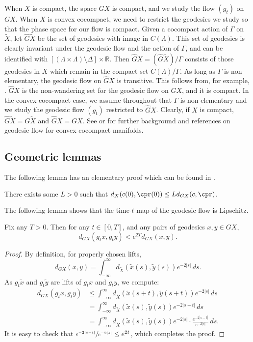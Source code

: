 When $X$ is compact, the space $GX$ is compact, and we study the flow $(g_t)$ on $GX$. When $X$ is convex cocompact, we need to restrict the geodesics we study so that the phase space for our flow is compact. Given a cocompact action of $\Gamma$ on $\tilde X$, let $\hat G\tilde X$ be the set of geodesics with image in $C(\Lambda)$. This set of geodesics is clearly invariant under the geodesic flow and the action of $\Gamma$, and can be identified with $[(\Lambda \times \Lambda)\setminus \Delta]\times \mathbb{R}$. Then $\hat G X = (\hat G\tilde X)/\Gamma$ consists of those geodesics in $X$ which remain in the compact set $C(\Lambda)/\Gamma$. As long as $\Gamma$ is non-elementary, the geodesic flow on $\hat GX$ is transitive. This follows from, for example, \cite[\S8.2]{gromov}. $\hat GX$ is the non-wandering set for the geodesic flow on $GX$, and it is compact. In the convex-cocompact case, we assume throughout that $\Gamma$ is non-elementary and we study the geodesic flow $(g_t)$ restricted to $\hat G X$. Clearly, if $X$ is compact, $\hat G\tilde X = G\tilde X$ and $\hat GX = GX$. See \cite{tapie} or \cite{mB95} for further background and references on geodesic flow for convex cocompact manifolds.

\subsection{Geometric lemmas}

The following lemma has an elementary proof which can be found in \cite[Lem.\,2.8]{CLT}.

\begin{lem}\label{lem:X GX bound}
There exists some $L>0$ such that $d_X(c(0), \cpr(0)) \leq L d_{GX}(c,\cpr)$.
\end{lem}

The following lemma shows that the time-$t$ map of the geodesic flow is Lipschitz.
\begin{lem}\label{lem:Lipschitz}
Fix any $T>0$. Then for any $t\in[0,T]$, and any pairs of geodesics $x,y\in GX$,
\[ d_{GX}(g_t x, g_t y) < e^{2T} d_{GX}(x,y). \]
\end{lem}

\begin{proof}
By definition, for properly chosen lifts,
\[ d_{GX}(x,y) = \int_{-\infty}^\infty d_{\tilde X}(\tilde x(s), \tilde y(s)) e^{-2|s|}\,ds. \]
As $g_t\tilde x$ and $g_t\tilde y$ are lifts of $g_tx$ and $g_ty$, we compute:
\begin{align*}
d_{GX}(g_tx,g_ty) & \leq \int_{-\infty}^\infty d_{\tilde X}(\tilde x(s+t),\tilde y(s+t))e^{-2|s|}\,ds \\
& = \int_{-\infty}^\infty d_{\tilde X}(\tilde x(s),\tilde y(s))e^{-2|s-t|}\,ds \\
& = \int_{-\infty}^\infty d_{\tilde X}(\tilde x(s),\tilde y(s))e^{-2|s|}\cdot \frac{e^{-2|s-t|}}{e^{-2|s|}}\,ds.  
\end{align*}
It is easy to check that $\sfrac{e^{-2|s-t|}}{e^{-2|s|}} \leq e^{2t}$, which completes the proof.
\end{proof}

